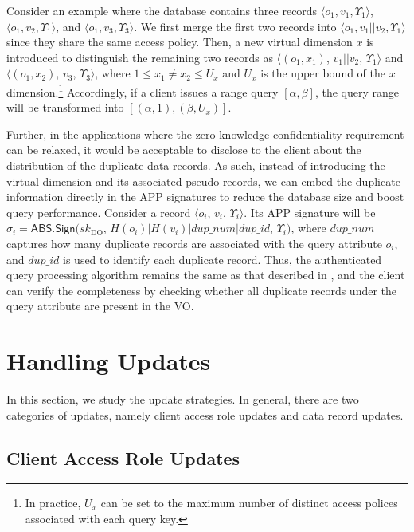 Consider an example where the database contains three records $\langle o_1, v_1, \Upsilon_1\rangle$, $\langle o_1, v_2, \Upsilon_1\rangle$, and $\langle o_1, v_3, \Upsilon_3\rangle$. We first merge the first two records into $\langle o_1, v_1 || v_2, \Upsilon_1\rangle$ since they share the same access policy. Then, a new virtual dimension $x$ is introduced to distinguish the remaining two records as $\langle (o_1, x_1)$, $v_1 || v_2$, $\Upsilon_1\rangle$ and $\langle (o_1, x_2)$, $v_3$, $\Upsilon_3\rangle$, where $1 \leq x_1 \neq x_2 \leq U_x$ and $U_x$ is the upper bound of the $x$ dimension.\footnote{In practice, $U_x$ can be set to the maximum number of distinct access polices associated with each query key.} Accordingly, if a client issues a range query $[\alpha, \beta]$, the query range will be transformed into $[(\alpha, 1), (\beta, U_x)]$.

Further, in the applications where the zero-knowledge confidentiality requirement can be relaxed, it would be acceptable to disclose to the client about the distribution of the duplicate data records. As such, instead of introducing the virtual dimension and its associated pseudo records, we can embed the duplicate information directly in the APP signatures to reduce the database size and boost query performance. Consider a record $\langle o_i$, $v_i$, $\Upsilon_i\rangle$. Its APP signature will be $\sigma_i = \textsf{ABS.Sign}({sk}_{\textrm{DO}}$, $H(o_i) | H(v_i) | dup\_num | dup\_id $, $\Upsilon_i)$, where $dup\_num$ captures how many duplicate records are associated with the query attribute $o_i$, and $dup\_id$ is used to identify each duplicate record. Thus, the authenticated query processing algorithm remains the same as that described in , and the client can verify the completeness by checking whether all duplicate records under the query attribute are present in the VO\@.

\section{Handling Updates}\label{sec:access-control:update}

In this section, we study the update strategies. In general, there are two categories of updates, namely client access role updates and data record updates.

\subsection{Client Access Role Updates}

